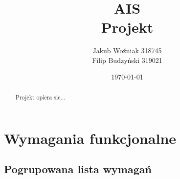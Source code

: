 \documentclass[a4paper,12pt]{article}
\theoremstyle{definition}
\begin{document}
\title{AIS \\ Projekt}
\author{Jakub Woźniak 318745 \\ Filip Budzyński 319021 \\}
\date{\small \today}
\maketitle

\begin{abstract}
Projekt opiera sie...
\end{abstract}

\tableofcontents
\newpage

\section{Wymagania funkcjonalne}

\subsection{Pogrupowana lista wymagań}
\end{document}
